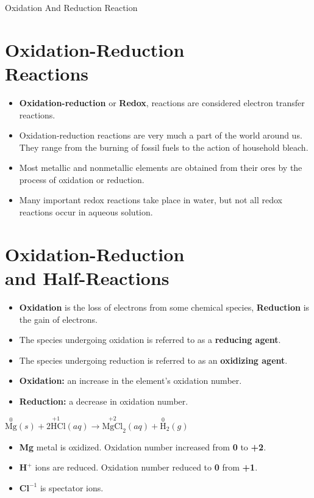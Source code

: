 \documentclass[a4paper,12pt,twocolumn]{article}
\begin{document}
\begin{center}
\huge{Oxidation And Reduction Reaction} \\[10pt]
\end{center}

\section{Oxidation-Reduction\\ Reactions}
\begin{itemize}
  \item \textbf{Oxidation-reduction} or \textbf{Redox}, reactions are considered electron transfer reactions.
  \item Oxidation-reduction reactions are very much a part of the world around us. They range from the burning of fossil fuels to the action of household bleach. 
  \item Most metallic and nonmetallic elements are obtained from their ores by the process of oxidation or reduction.
  \item Many important redox reactions take place in water, but not all redox reactions occur in aqueous solution.
\end{itemize}

\section{Oxidation-Reduction\\
and Half-Reactions}
\begin{itemize}
\item \textbf{Oxidation} is the loss of electrons from some chemical species, \textbf{Reduction} is the gain of electrons.
\item The species undergoing oxidation is referred to as a \textbf{reducing agent}.
\item The species undergoing reduction is referred to as an \textbf{oxidizing agent}.
\item \textbf{Oxidation:} an increase in the element’s oxidation number. 
\item \textbf{Reduction:} a decrease in oxidation number.
\end{itemize}

\begin{Box1}{}

$\stackrel{0}{\mathrm{Mg}}(s)+\stackrel{+1}{2 \mathrm{HCl}}(a q) \longrightarrow  \stackrel{+2}{\mathrm{MgCl}}_{2}(a q)+\stackrel{0}{\mathrm{H}}_{2}(g)$

\begin{itemize}
\item \textbf{Mg} metal is oxidized. Oxidation number increased from \textbf{0} to \textbf{+2}.
\item $\textbf{H}^+$ ions are reduced. Oxidation number reduced to \textbf{0} from \textbf{+1}.
\item $\textbf{Cl}^{-1}$ is spectator ions.
\end{itemize}
\end{Box1}
\end{document}
